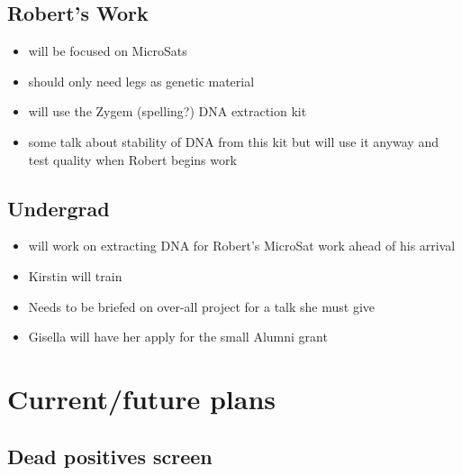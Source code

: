 \documentclass[letterpaper]{scrartcl}
\begin{document}
\subsection{Robert's Work}\label{roberts-work}

\begin{itemize}
\itemsep1pt\parskip0pt
\item
  will be focused on MicroSats
\item
  should only need legs as genetic material
\item
  will use the Zygem (spelling?) DNA extraction kit
\item
  some talk about stability of DNA from this kit but will use it anyway
  and test quality when Robert begins work
\end{itemize}

\subsection{Undergrad}\label{undergrad}

\begin{itemize}
\itemsep1pt\parskip0pt
\item
  will work on extracting DNA for Robert's MicroSat work ahead of his
  arrival
\item
  Kirstin will train
\item
  Needs to be briefed on over-all project for a talk she must give
\item
  Gisella will have her apply for the small Alumni grant
\end{itemize}

\section{Current/future plans}\label{currentfuture-plans}

\subsection{Dead positives screen}\label{dead-positives-screen}
\end{document}
